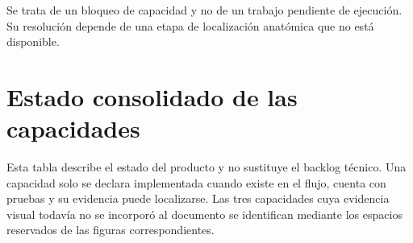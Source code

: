 Se trata de un bloqueo de capacidad y no de un trabajo pendiente de ejecución. Su resolución depende de una etapa de localización anatómica que no está disponible.

\section{Estado consolidado de las capacidades}


Esta tabla describe el estado del producto y no sustituye el backlog técnico. Una capacidad solo se declara implementada cuando existe en el flujo, cuenta con pruebas y su evidencia puede localizarse. Las tres capacidades cuya evidencia visual todavía no se incorporó al documento se identifican mediante los espacios reservados de las figuras correspondientes.
